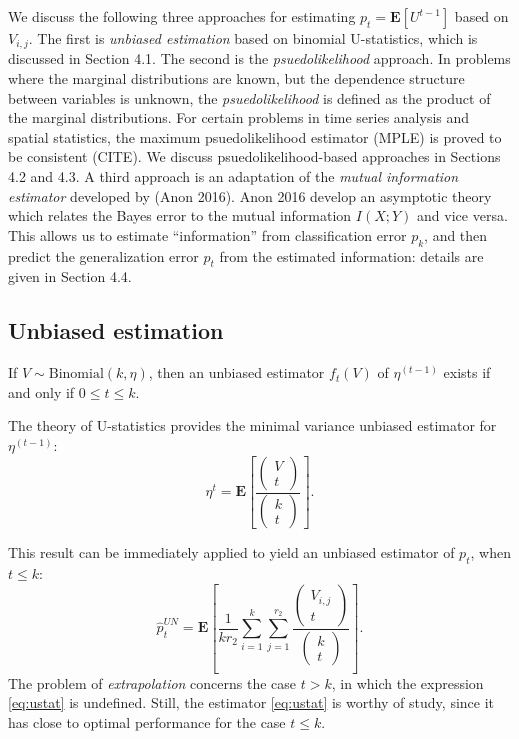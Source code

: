 \documentclass{article}
\newcommand{\E}{\textbf{E}}
\begin{document}
We discuss the following three approaches for estimating $p_t = \E[U^{t-1}]$ based on $V_{i, j}$.
The first is \emph{unbiased estimation} based on binomial U-statistics, which is discussed in Section 4.1.
The second is the \emph{psuedolikelihood} approach.  In problems where the marginal distributions
are known, but the dependence structure between variables is unknown, the \emph{psuedolikelihood} is defined
as the product of the marginal distributions.  For certain problems in time series analysis and
spatial statistics, the maximum psuedolikelihood estimator (MPLE) is proved to be consistent (CITE).
We discuss psuedolikelihood-based approaches in Sections 4.2 and 4.3.
A third approach is an adaptation of the \emph{mutual information estimator} developed by (Anon 2016).
Anon 2016 develop an asymptotic theory which relates the Bayes error to the mutual information $I(X; Y)$
and vice versa.  This allows us to estimate ``information'' from classification error $p_k$, and then predict
the generalization error $p_t$ from the estimated information: details are given in Section 4.4.

\subsection{Unbiased estimation}

If $V \sim \text{Binomial}(k, \eta)$, then an unbiased estimator $f_t(V)$ of $\eta^(t-1)$ exists
if and only if $0 \leq t \leq k$.

The theory of U-statistics provides the minimal variance unbiased estimator for $\eta^(t-1)$:
\[
\eta^t = \E\left[\frac{\begin{pmatrix}
V \\ t
\end{pmatrix}}{\begin{pmatrix}
k \\ t
\end{pmatrix}}\right].
\]

This result can be immediately applied to yield an unbiased estimator of $p_t$, when $t \leq k$:
\begin{equation}\label{eq:ustat}
\hat{p}_t^{UN} = \E\left[ \frac{1}{kr_2}\sum_{i=1}^k\sum_{j=1}^{r_2} \frac{\begin{pmatrix}
V_{i, j} \\ t
\end{pmatrix}}{\begin{pmatrix}
k \\ t
\end{pmatrix}} \right].
\end{equation}
The problem of \emph{extrapolation} concerns the case $t > k$, in which the expression \eqref{eq:ustat} is undefined.
Still, the estimator \eqref{eq:ustat} is worthy of study, since it has close to optimal performance for the case $t \leq k$.
\end{document}
